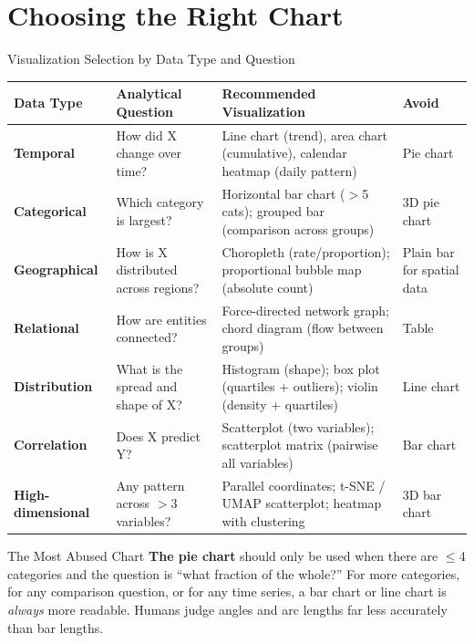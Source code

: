 \documentclass[aspectratio=169,10pt]{beamer}
\begin{document}
\section{Choosing the Right Chart}

\begin{frame}{Visualization Selection by Data Type and Question}
  \centering
  \renewcommand{\arraystretch}{1.5}
  \begin{tabular}{p{2.4cm}p{3.0cm}p{5.2cm}p{1.8cm}}
    \toprule
    \textbf{Data Type} & \textbf{Analytical Question} & \textbf{Recommended Visualization} & \textbf{Avoid} \\
    \midrule
    \textbf{Temporal} &
      How did X change over time? &
      Line chart (trend), area chart (cumulative), calendar heatmap (daily pattern) &
      Pie chart \\
    \textbf{Categorical} &
      Which category is largest? &
      Horizontal bar chart ($>$5 cats); grouped bar (comparison across groups) &
      3D pie chart \\
    \textbf{Geographical} &
      How is X distributed across regions? &
      Choropleth (rate/proportion); proportional bubble map (absolute count) &
      Plain bar for spatial data \\
    \textbf{Relational} &
      How are entities connected? &
      Force-directed network graph; chord diagram (flow between groups) &
      Table \\
    \textbf{Distribution} &
      What is the spread and shape of X? &
      Histogram (shape); box plot (quartiles + outliers); violin (density + quartiles) &
      Line chart \\
    \textbf{Correlation} &
      Does X predict Y? &
      Scatterplot (two variables); scatterplot matrix (pairwise all variables) &
      Bar chart \\
    \textbf{High-dimensional} &
      Any pattern across $>$3 variables? &
      Parallel coordinates; t-SNE / UMAP scatterplot; heatmap with clustering &
      3D bar chart \\
    \bottomrule
  \end{tabular}
  \vspace{4pt}
  \begin{alertblock}{\small The Most Abused Chart}
    \small \textbf{The pie chart} should only be used when there are $\leq$4 categories and the question is ``what fraction of the whole?''  For more categories, for any comparison question, or for any time series, a bar chart or line chart is \textit{always} more readable.  Humans judge angles and arc lengths far less accurately than bar lengths.
  \end{alertblock}
\end{frame}
\end{document}
